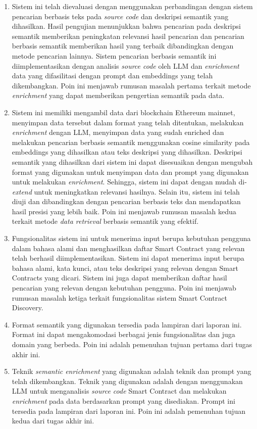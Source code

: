 \begin{enumerate}
	\item Sistem ini telah dievaluasi dengan menggunakan perbandingan dengan sistem pencarian berbasis teks pada \textit{source code} dan deskripsi semantik yang dihasilkan. Hasil pengujian menunjukkan bahwa pencarian pada deskripsi semantik memberikan peningkatan relevansi hasil pencarian dan pencarian berbasis semantik memberikan hasil yang terbaik dibandingkan dengan metode pencarian lainnya. Sistem pencarian berbasis semantik ini diimplementasikan dengan analisis \textit{source code} oleh LLM dan \textit{enrichment} data yang difasilitasi dengan prompt dan embeddings yang telah dikembangkan. Poin ini menjawab rumusan masalah pertama terkait metode \textit{enrichment} yang dapat memberikan pengertian semantik pada data.
	\item Sistem ini memiliki mengambil data dari blockchain Ethereum mainnet, menyimpan data tersebut dalam format yang telah ditentukan, melakukan \textit{enrichment} dengan LLM, menyimpan data yang sudah enriched dan melakukan pencarian berbasis semantik menggunakan cosine similarity pada embeddings yang dihasilkan atau teks deskripsi yang dihasilkan. Deskripsi semantik yang dihasilkan dari sistem ini dapat disesuaikan dengan mengubah format yang digunakan untuk menyimpan data dan prompt yang digunakan untuk melakukan \textit{enrichment}. Sehingga, sistem ini dapat dengan mudah di-\textit{extend} untuk meningkatkan relevansi hasilnya. Selain itu, sistem ini telah diuji dan dibandingkan dengan pencarian berbasis teks dan mendapatkan hasil presisi yang lebih baik. Poin ini menjawab rumusan masalah kedua terkait metode \textit{data retrieval} berbasis semantik yang efektif.
	\item Fungsionalitas sistem ini untuk menerima input berupa kebutuhan pengguna dalam bahasa alami dan menghasilkan daftar Smart Contract yang relevan telah berhasil diimplementasikan. Sistem ini dapat menerima input berupa bahasa alami, kata kunci, atau teks deskripsi yang relevan dengan Smart Contracts yang dicari. Sistem ini juga dapat memberikan daftar hasil pencarian yang relevan dengan kebutuhan pengguna. Poin ini menjawab rumusan masalah ketiga terkait fungsionalitas sistem Smart Contract Discovery.
	\item Format semantik yang digunakan tersedia pada lampiran dari laporan ini. Format ini dapat mengakomodasi berbagai jenis fungsionalitas dan juga domain yang berbeda. Poin ini adalah pemenuhan tujuan pertama dari tugas akhir ini.
	\item Teknik \textit{semantic enrichment} yang digunakan adalah teknik dan prompt yang telah dikembangkan. Teknik yang digunakan adalah dengan menggunakan LLM untuk menganalisis \textit{source code} Smart Contract dan melakukan \textit{enrichment} pada data berdasarkan prompt yang disediakan. Prompt ini tersedia pada lampiran dari laporan ini. Poin ini adalah pemenuhan tujuan kedua dari tugas akhir ini.

\end{enumerate}
